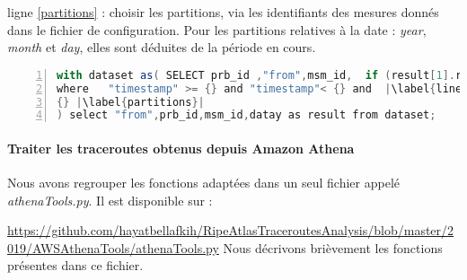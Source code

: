 \documentclass[]{report}
\begin{document}
 ligne \ref{partitions} : choisir les partitions, via les identifiants des mesures donnés dans le fichier de configuration. Pour les partitions relatives à la date : \textit{year}, \textit{month} et \textit{day}, elles sont déduites de la période en cours.
\begin{lstlisting}[language=scala,firstnumber=1, caption={ Requête SQL dans Athena },label={lst:sqlrequest}, basicstyle = \footnotesize,escapechar=|,numbers=left,
stepnumber=1]
with dataset as( SELECT prb_id ,"from",msm_id,  if (result[1].result[1].err is  null and result[1].result is not null ,transform(result , x -> transform (x.result, entry->  Map(array[ if (entry."from" is not null, concat('"',cast(entry."from" as varchar),'"') , concat('"','none','"')) ],  array[if (entry."from" is not null ,entry."rtt" ,0)]  ))),array[])  as datay from traceroutes_api 
where   "timestamp" >= {} and "timestamp"< {} and  |\label{lineperiode}|
{} |\label{partitions}|
) select "from",prb_id,msm_id,datay as result from dataset;
\end{lstlisting}

\paragraph{Traiter les traceroutes obtenus depuis Amazon Athena}

Nous avons regrouper les fonctions adaptées  dans un seul fichier appelé \textit{athenaTools.py}. Il est disponible sur : 

\url{https://github.com/hayatbellafkih/RipeAtlasTraceroutesAnalysis/blob/master/2019/AWSAthenaTools/athenaTools.py} Nous décrivons brièvement les fonctions présentes dans ce fichier.
\end{document}
